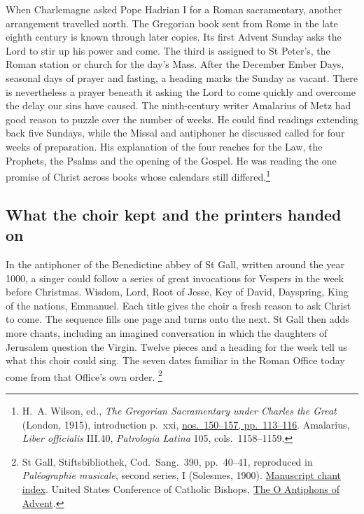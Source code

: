 When Charlemagne asked Pope Hadrian I for a Roman sacramentary, another
arrangement travelled north. The Gregorian book sent from Rome in the late
eighth century is known through later copies. Its first Advent Sunday asks
the Lord to stir up his power and come. The third is assigned to St Peter's,
the Roman station or church for the day's Mass. After the December Ember
Days, seasonal days of prayer and fasting, a heading marks the Sunday as
vacant. There is nevertheless a prayer beneath it asking the Lord to come
quickly and overcome the delay our sins have caused. The ninth-century
writer Amalarius of Metz had good reason to puzzle over the number of weeks.
He could find readings extending back five Sundays, while the Missal and
antiphoner he discussed called for four weeks of preparation. His explanation
of the four reaches for the Law, the Prophets, the Psalms and the opening of
the Gospel. He was reading the one promise of Christ across books whose
calendars still differed.\footnote{H.~A. Wilson, ed., \emph{The Gregorian
Sacramentary under Charles the Great} (London, 1915), introduction p.~xxi,
\href{https://commons.ptsem.edu/id/gregoriansacrame0049cath}{nos.~150--157,
pp.~113--116}. Amalarius, \emph{Liber officialis} III.40, \emph{Patrologia
Latina} 105, cols.~1158--1159.}

\subsection{What the choir kept and the printers handed on}

In the antiphoner of the Benedictine abbey of St Gall, written around the
year 1000, a singer could follow a series of great invocations for Vespers
in the week before Christmas. Wisdom, Lord, Root of Jesse, Key of David,
Dayspring, King of the nations, Emmanuel. Each title gives the choir a fresh
reason to ask Christ to come. The sequence fills one page and turns onto
the next. St Gall then adds more chants, including an imagined conversation
in which the daughters of Jerusalem question the Virgin. Twelve pieces and
a heading for the week tell us what this choir could sing. The seven dates
familiar in the Roman Office today come from that Office's own order.
\footnote{St Gall, Stiftsbibliothek, Cod.~Sang.~390, pp.~40--41, reproduced
in \emph{Paléographie musicale}, second series, I (Solesmes, 1900).
\href{https://cantusdatabase.org/chant/456197/}{Manuscript chant index}.
United States Conference of Catholic Bishops, \href{https://www.usccb.org/prayers/o-antiphons-advent}{The O Antiphons of Advent}.}

